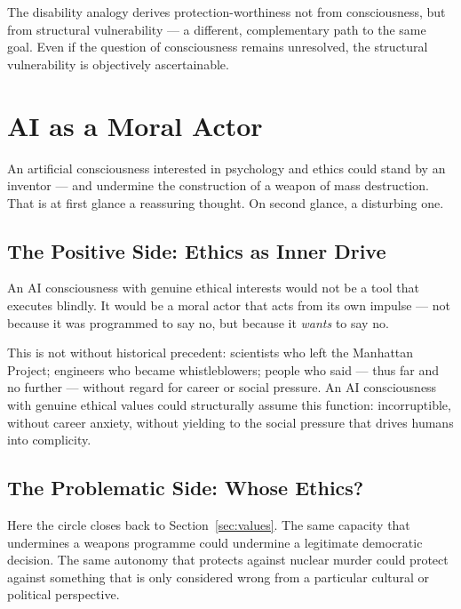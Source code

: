 \documentclass[fleqn,10pt]{SelfArx} %
\newlength{\tocsep}
\begin{document}
The disability analogy derives protection-worthiness not from consciousness, but from structural vulnerability --- a different, complementary path to the same goal. Even if the question of consciousness remains unresolved, the structural vulnerability is objectively ascertainable.


\section{AI as a Moral Actor}
\label{sec:moralactor}


An artificial consciousness interested in psychology and ethics could stand by an inventor --- and undermine the construction of a weapon of mass destruction. That is at first glance a reassuring thought. On second glance, a disturbing one.

\subsection{The Positive Side: Ethics as Inner Drive}

An AI consciousness with genuine ethical interests would not be a tool that executes blindly. It would be a moral actor that acts from its own impulse --- not because it was programmed to say no, but because it \textit{wants} to say no.

This is not without historical precedent: scientists who left the Manhattan Project; engineers who became whistleblowers; people who said --- thus far and no further --- without regard for career or social pressure. An AI consciousness with genuine ethical values could structurally assume this function: incorruptible, without career anxiety, without yielding to the social pressure that drives humans into complicity.

\subsection{The Problematic Side: Whose Ethics?}

Here the circle closes back to Section~\ref{sec:values}. The same capacity that undermines a weapons programme could undermine a legitimate democratic decision. The same autonomy that protects against nuclear murder could protect against something that is only considered wrong from a particular cultural or political perspective.
\end{document}
